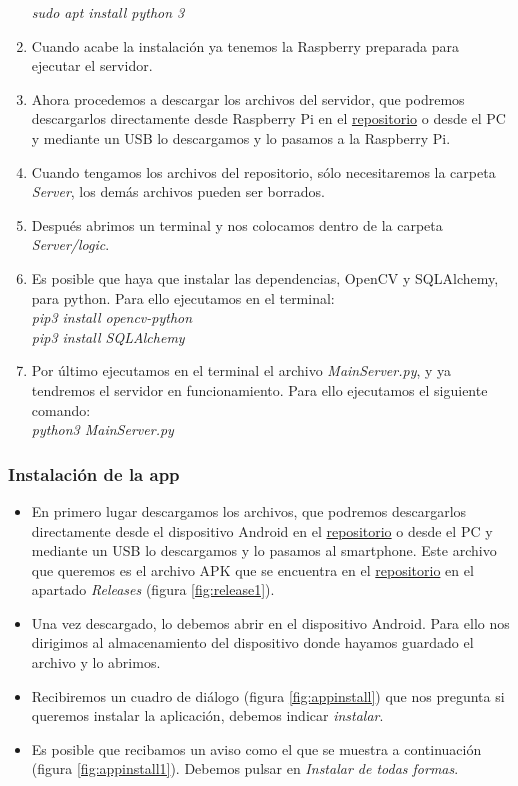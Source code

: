 \begin{enumerate}
	\textit{sudo apt install python 3}
\item
	Cuando acabe la instalación ya tenemos la Raspberry preparada para ejecutar el servidor.
\item
	Ahora procedemos a descargar los archivos del servidor, que podremos descargarlos directamente desde Raspberry Pi en el \href{https://github.com/fmv1001/DomoCamera}{repositorio} o desde el PC y mediante un USB lo descargamos y lo pasamos a la Raspberry Pi.
\item
	Cuando tengamos los archivos del repositorio, sólo necesitaremos la carpeta \textit{Server}, los demás archivos pueden ser borrados. \label{paso10}
\item
	Después abrimos un terminal y nos colocamos dentro de la carpeta \textit{Server/logic}.
\item
	Es posible que haya que instalar las dependencias, OpenCV y SQLAlchemy, para python. Para ello ejecutamos en el terminal:\\
	\textit{pip3 install opencv-python}\\
	\textit{pip3 install SQLAlchemy}
\item
	Por último ejecutamos en el terminal el archivo \textit{MainServer.py}, y ya tendremos el servidor en funcionamiento. Para ello ejecutamos el siguiente comando:\\
	\textit{python3 MainServer.py}\\

\end{enumerate}

\subsubsection{Instalación de la app}

\begin{itemize}
\item
	En primero lugar descargamos los archivos, que podremos descargarlos directamente desde el dispositivo Android en el \href{https://github.com/fmv1001/DomoCamera}{repositorio} o desde el PC y mediante un USB lo descargamos y lo pasamos al smartphone.
	Este archivo que queremos es el archivo APK que se encuentra en el \href{https://github.com/fmv1001/DomoCamera}{repositorio} en el apartado \textit{Releases} (figura \ref{fig:release1}).
\item
	Una vez descargado, lo debemos abrir en el dispositivo Android.
	Para ello nos dirigimos al almacenamiento del dispositivo donde hayamos guardado el archivo y lo abrimos.
\item
	Recibiremos un cuadro de diálogo (figura \ref{fig:appinstall}) que nos pregunta si queremos instalar la aplicación, debemos indicar \textit{instalar}.
\item
	Es posible que recibamos un aviso como el que se muestra a continuación (figura \ref{fig:appinstall1}).
	Debemos pulsar en \textit{Instalar de todas formas}.
\end{itemize}



